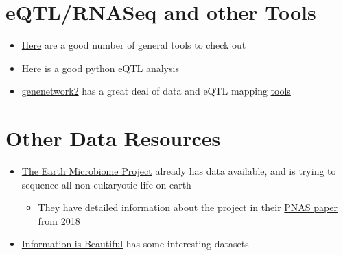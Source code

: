 \documentclass[]{book}
\providecommand{\tightlist}{%
  \setlength{\itemsep}{0pt}\setlength{\parskip}{0pt}}
\begin{document}
\section{eQTL/RNASeq and other Tools}\label{eqtlrnaseq-and-other-tools}

\begin{itemize}
\tightlist
\item
  \href{https://adinasarapu.github.io/year-archive/}{Here} are a good
  number of general tools to check out
\item
  \href{https://github.com/molgenis/systemsgenetics/wiki/eQTL-mapping-analysis-cookbook-for-RNA-seq-data}{Here}
  is a good python eQTL analysis
\item
  \href{http://gn2.genenetwork.org/}{genenetwork2} has a great deal of
  data and eQTL mapping
  \href{https://github.com/genenetwork/genenetwork2}{tools}
\end{itemize}

\section{Other Data Resources}\label{other-data-resources}

\begin{itemize}
\tightlist
\item
  \href{http://www.earthmicrobiome.org/data-and-code/}{The Earth
  Microbiome Project} already has data available, and is trying to
  sequence all non-eukaryotic life on earth

  \begin{itemize}
  \tightlist
  \item
    They have detailed information about the project in their
    \href{http://www.pnas.org/content/115/17/4325.long}{PNAS paper} from
    2018
  \end{itemize}
\item
  \href{https://informationisbeautiful.net/}{Information is Beautiful}
  has some interesting datasets
\end{itemize}


\end{document}
